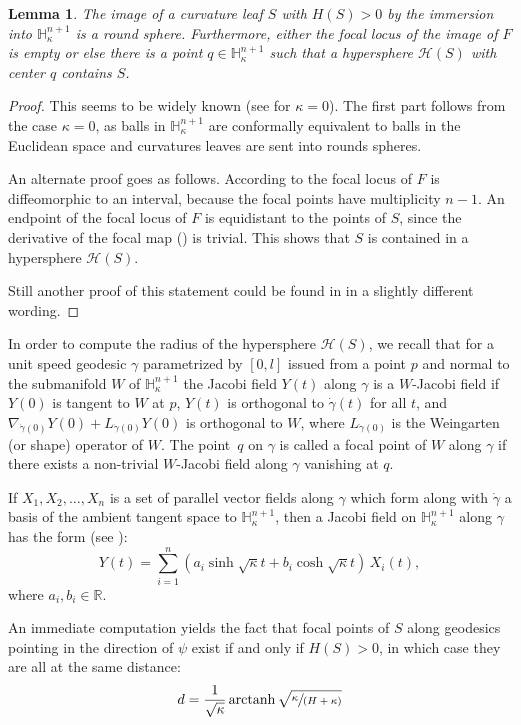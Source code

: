 \documentclass[JEP,XML,SOM,Unicode]{cedram}
\let\mathcal\mathscr
\DeclareMathOperator{\arctanh}{arctanh}
\newcommand{\spfrac}[2]{\sfrac{#1}{(#2)}}
\newtheorem{lemma}[theorem]{Lemma}
\theoremstyle{definition}
\theoremstyle{remark}
\numberwithin{equation}{section}
\begin{document}
\begin{lemma}
The image of a curvature leaf $S$ with $H(S) >0$ by the immersion into $\mathbb H_{\kappa}^{n+1}$
is a round sphere. Furthermore, either the focal locus of the image of $F$ is empty or else there is a point
$q\in \mathbb H^{n+1}_{\kappa}$ such that a hypersphere
$\mathcal H(S)$ with center $q$ contains $S$.
\end{lemma}
\begin{proof}
This seems to be widely known (see \cite{GM} for $\kappa=0$).
The first part follows from the case $\kappa=0$, as balls in
$\mathbb H^{n+1}_{\kappa}$ are conformally equivalent
to balls in the Euclidean space and curvatures leaves are sent into rounds spheres.

An alternate proof goes as follows. According to \cite{CR} the focal locus of $F$ is diffeomorphic
to an interval, because the focal points have multiplicity $n-1$.
An endpoint of the focal locus of $F$
is equidistant to the points of $S$, since the derivative of the focal map (\cite[\S1.e,\,Th..\,2.1\,\&\,proof of Th.\,3.1]{CR}) is trivial. This shows that $S$ is contained in a
hypersphere $\mathcal H(S)$.

Still another proof of this statement
could be found in \cite{IPS} in a slightly different wording.
\end{proof}

In order to compute the radius of the hypersphere $\mathcal H(S)$, we
recall that for a unit speed geodesic $\gamma$ parametrized by
$[0,l]$ issued from a point $p$ and
normal to the submanifold $W$ of $\mathbb H_{\kappa}^{n+1}$
the Jacobi field $Y(t)$ along $\gamma$ is a $W$-Jacobi field
if $Y(0)$ is tangent to $W$ at $p$, $Y(t)$ is orthogonal to $\dot{\gamma}(t)$
for all $t$, and
$\nabla_{\dot{\gamma}(0)} Y(0) + L_{\dot{\gamma}(0)}Y(0)$ is orthogonal
to $W$, where $L_{\dot{\gamma}(0)}$ is the Weingarten (or shape)
operator of $W$. The point~$q$ on $\gamma$ is called a focal
point of $W$ along $\gamma$ if there exists a non-trivial
$W$-Jacobi field along $\gamma$ vanishing at $q$.

If $X_1,X_2,\ldots,X_n$ is a set of parallel vector fields along $\gamma$
which form along with $\dot{\gamma}$ a basis of the ambient
tangent space to $\mathbb H_{\kappa}^{n+1}$, then
a Jacobi field on $\mathbb H_{\kappa}^{n+1}$ along $\gamma$
has the form (see \cite{CE}):
\[ Y(t)=\sum_{i=1}^{n} (a_i \sinh \sqrt{\kappa} t+
b_i \cosh \sqrt{\kappa} t)\, X_i(t),\]
where $a_i,b_i\in\mathbb R$.

An immediate computation
yields the fact that focal points of $S$ along
geodesics pointing in the direction of
$\psi$ exist if and only if $H(S)>0$, in which case
they are all at the same distance:
\[d=\frac{1}{\sqrt{\kappa}}\arctanh \sqrt{\spfrac{\kappa}{H+\kappa}}\]
\end{document}
